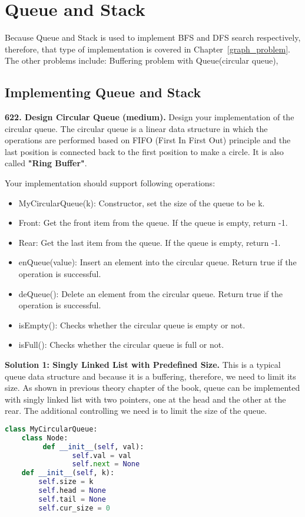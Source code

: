 \documentclass[../main.tex]{subfiles}
\begin{document}
\section{Queue and Stack}
Because Queue and Stack is used to implement BFS and DFS search respectively, therefore, that type of implementation is covered in Chapter~\ref{graph_problem}.  The other problems include: Buffering problem with Queue(circular queue), 
\subsection{Implementing Queue and Stack}
\begin{examples}[resume]
\item \textbf{622. Design Circular Queue (medium).} Design your implementation of the circular queue. The circular queue is a linear data structure in which the operations are performed based on FIFO (First In First Out) principle and the last position is connected back to the first position to make a circle. It is also called \textbf{"Ring Buffer"}.

Your implementation should support following operations:
\begin{itemize}
    \item MyCircularQueue(k): Constructor, set the size of the queue to be k.
    \item Front: Get the front item from the queue. If the queue is empty, return -1.
    \item Rear: Get the last item from the queue. If the queue is empty, return -1.
    \item enQueue(value): Insert an element into the circular queue. Return true if the operation is successful.
    \item deQueue(): Delete an element from the circular queue. Return true if the operation is successful.
    \item isEmpty(): Checks whether the circular queue is empty or not.
    \item isFull(): Checks whether the circular queue is full or not.
\end{itemize}

\textbf{Solution 1: Singly Linked List with Predefined Size.} This is a typical queue data structure and because it is a buffering, therefore, we need to limit its size. As shown in previous theory chapter of the book, queue can be implemented with singly linked list with two pointers, one at the head and the other at the rear. The additional controlling we need is to limit the size of the queue.
\begin{lstlisting}[language=Python]
class MyCircularQueue:
    class Node:
         def __init__(self, val):
                self.val = val
                self.next = None
    def __init__(self, k):
        self.size = k
        self.head = None
        self.tail = None
        self.cur_size = 0       


\end{lstlisting}
\end{examples}
\end{document}
